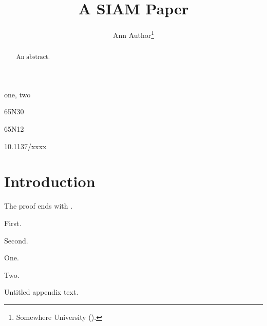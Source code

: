\documentclass{siamart220329}
\title{A SIAM Paper}
\author{Ann Author\thanks{Somewhere University (\email{ann@x.org}).}}
\begin{document}
\maketitle
\begin{abstract}An abstract.\end{abstract}
\begin{keywords}one, two\end{keywords}
\begin{MSCcode}65N30\end{MSCcode}
\begin{AM}65N12\end{AM}
\begin{DOI}10.1137/xxxx\end{DOI}
\section{Introduction}
The proof ends with \proofbox.
\begin{romannum}\item First.\item Second.\end{romannum}
\begin{remunerate}\item One.\item Two.\end{remunerate}
\appendix
\appendixnotitle
Untitled appendix text.
\end{document}
